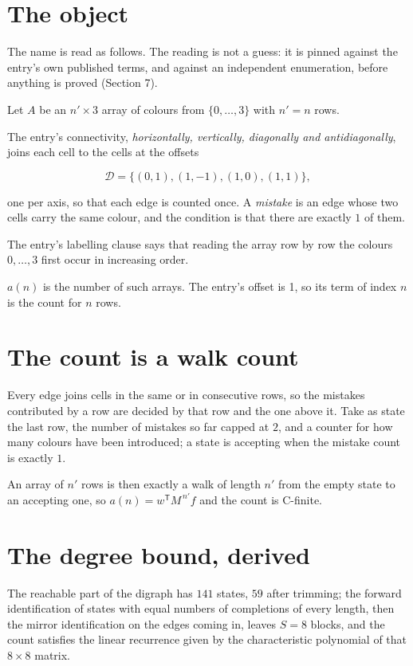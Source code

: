 \documentclass[11pt]{article}
\theoremstyle{definition}
\begin{document}
\section{The object}

The name is read as follows. The reading is not a guess: it is pinned against the entry's own published terms, and against an independent enumeration, before anything is proved (Section 7).

Let $A$ be an $n' \times 3$ array of colours from $\{0,\dots,3\}$ with $n' = n$ rows.

The entry's connectivity, {\itshape horizontally, vertically, diagonally and antidiagonally}, joins each cell to the cells at the offsets

\[\mathcal{D} = \{(0,1), (1,-1), (1,0), (1,1)\},\]

one per axis, so that each edge is counted once. A {\itshape mistake} is an edge whose two cells carry the same colour, and the condition is that there are exactly $1$ of them.

The entry's labelling clause says that reading the array row by row the colours $0,\dots,3$ first occur in increasing order.

$a(n)$ is the number of such arrays. The entry's offset is 1, so its term of index $n$ is the count for $n$ rows.

\section{The count is a walk count}

Every edge joins cells in the same or in consecutive rows, so the mistakes contributed by a row are decided by that row and the one above it. Take as state the last row, the number of mistakes so far capped at $2$, and a counter for how many colours have been introduced; a state is accepting when the mistake count is exactly $1$.

An array of $n'$ rows is then exactly a walk of length $n'$ from the empty state to an accepting one, so $a(n) = w^{\mathsf T}M^{\,n'}f$ and the count is C-finite.

\section{The degree bound, derived}

The reachable part of the digraph has $141$ states, $59$ after trimming; the forward identification of states with equal numbers of completions of every length, then the mirror identification on the edges coming in, leaves $S = 8$ blocks, and the count satisfies the linear recurrence given by the characteristic polynomial of that $8\times8$ matrix.
\end{document}
